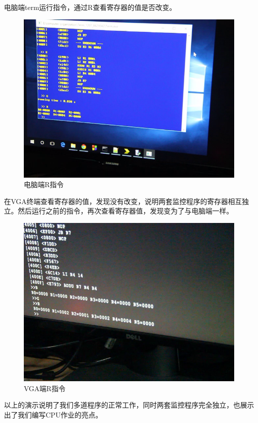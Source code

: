 电脑端term运行指令，通过R查看寄存器的值是否改变。

\begin{figure}[H]
  \centering
  \includegraphics[width=4.5in]{Figures/picture/vlcsnap-2015-12-10-00h19m17s659.png}
  \caption{电脑端R指令}
\end{figure}

在VGA终端查看寄存器的值，发现没有改变，说明两套监控程序的寄存器相互独立。然后运行之前的指令，再次查看寄存器值，发现变为了与电脑端一样。

\begin{figure}[H]
  \centering
  \includegraphics[width=4.5in]{Figures/picture/vlcsnap-2015-12-10-00h19m57s104.png}
  \caption{VGA端R指令}
\end{figure}

以上的演示说明了我们多道程序的正常工作，同时两套监控程序完全独立，也展示出了我们编写CPU作业的亮点。


